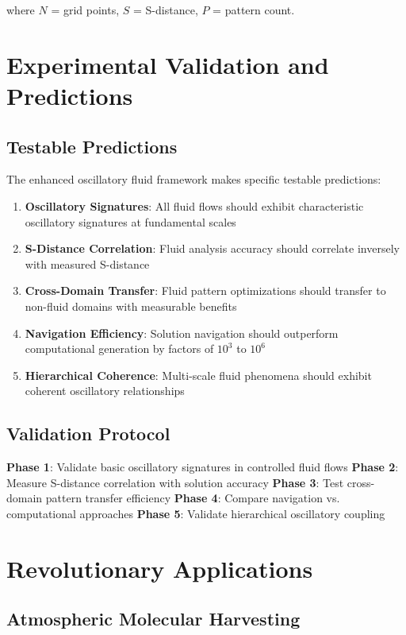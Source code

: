 \documentclass[12pt,a4paper]{article}
\begin{document}
where $N$ = grid points, $S$ = S-distance, $P$ = pattern count.

\section{Experimental Validation and Predictions}

\subsection{Testable Predictions}

The enhanced oscillatory fluid framework makes specific testable predictions:

\begin{enumerate}
\item \textbf{Oscillatory Signatures}: All fluid flows should exhibit characteristic oscillatory signatures at fundamental scales
\item \textbf{S-Distance Correlation}: Fluid analysis accuracy should correlate inversely with measured S-distance
\item \textbf{Cross-Domain Transfer}: Fluid pattern optimizations should transfer to non-fluid domains with measurable benefits
\item \textbf{Navigation Efficiency}: Solution navigation should outperform computational generation by factors of $10^3$ to $10^6$
\item \textbf{Hierarchical Coherence}: Multi-scale fluid phenomena should exhibit coherent oscillatory relationships
\end{enumerate}

\subsection{Validation Protocol}

\textbf{Phase 1}: Validate basic oscillatory signatures in controlled fluid flows
\textbf{Phase 2}: Measure S-distance correlation with solution accuracy
\textbf{Phase 3}: Test cross-domain pattern transfer efficiency
\textbf{Phase 4}: Compare navigation vs. computational approaches
\textbf{Phase 5}: Validate hierarchical oscillatory coupling

\section{Revolutionary Applications}

\subsection{Atmospheric Molecular Harvesting}
\end{document}

